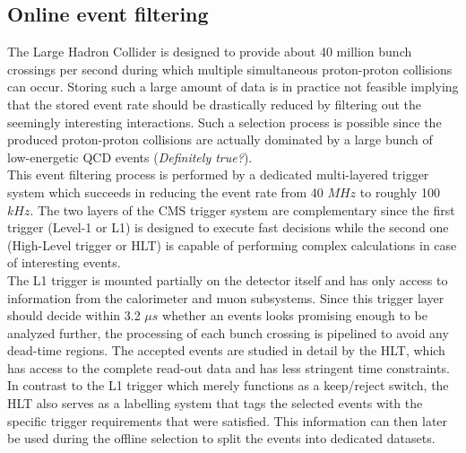 \subsection{Online event filtering}
The Large Hadron Collider is designed to provide about 40 million bunch crossings per second during which multiple simultaneous proton-proton collisions can occur. Storing such a large amount of data is in practice not feasible implying that the stored event rate should be drastically reduced by filtering out the seemingly interesting interactions. Such a selection process is possible since the produced proton-proton collisions are actually dominated by a large bunch of low-energetic QCD events (\textit{Definitely true?}).
\\
This event filtering process is performed by a dedicated multi-layered trigger system which succeeds in reducing the event rate from 40 $\unit{MHz}$ to roughly 100 $\unit{kHz}$. The two layers of the CMS trigger system are complementary since the first trigger (Level-1 or L1) is designed to execute fast decisions while the second one (High-Level trigger or HLT) is capable of performing complex calculations in case of interesting events.
\\
The L1 trigger is mounted partially on the detector itself and has only access to information from the calorimeter and muon subsystems. Since this trigger layer should decide within 3.2 $\unit{\mu s}$ whether an events looks promising enough to be analyzed further, the processing of each bunch crossing is pipelined to avoid any dead-time regions. The accepted events are studied in detail by the HLT, which has access to the complete read-out data and has less stringent time constraints. In contrast to the L1 trigger which merely functions as a keep/reject switch, the HLT also serves as a labelling system that tags the selected events with the specific trigger requirements that were satisfied. This information can then later be used during the offline selection to split the events into dedicated datasets.

